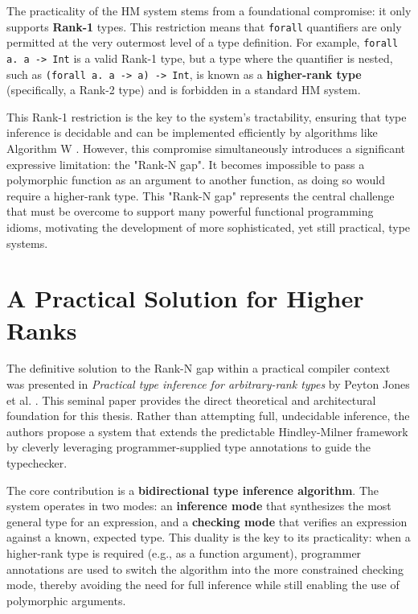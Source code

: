 The practicality of the HM system stems from a foundational compromise: it only supports \textbf{Rank-1} types. This restriction means that \texttt{forall} quantifiers are only permitted at the very outermost level of a type definition. For example, \texttt{forall a. a -> Int} is a valid Rank-1 type, but a type where the quantifier is nested, such as \texttt{(forall a. a -> a) -> Int}, is known as a \textbf{higher-rank type} (specifically, a Rank-2 type) and is forbidden in a standard HM system.

This Rank-1 restriction is the key to the system's tractability, ensuring that type inference is decidable and can be implemented efficiently by algorithms like Algorithm W \cite{jones-practical-2007}. However, this compromise simultaneously introduces a significant expressive limitation: the "Rank-N gap". It becomes impossible to pass a polymorphic function as an argument to another function, as doing so would require a higher-rank type. This "Rank-N gap" represents the central challenge that must be overcome to support many powerful functional programming idioms, motivating the development of more sophisticated, yet still practical, type systems.

\section{A Practical Solution for Higher Ranks}
\label{sec:LitReviewJones2007}

The definitive solution to the Rank-N gap within a practical compiler context was presented in \textit{Practical type inference for arbitrary-rank types} by Peyton Jones et al. \cite{jones-practical-2007}. This seminal paper provides the direct theoretical and architectural foundation for this thesis. Rather than attempting full, undecidable inference, the authors propose a system that extends the predictable Hindley-Milner framework by cleverly leveraging programmer-supplied type annotations to guide the typechecker.

The core contribution is a \textbf{bidirectional type inference algorithm}. The system operates in two modes: an \textbf{inference mode} that synthesizes the most general type for an expression, and a \textbf{checking mode} that verifies an expression against a known, expected type. This duality is the key to its practicality: when a higher-rank type is required (e.g., as a function argument), programmer annotations are used to switch the algorithm into the more constrained checking mode, thereby avoiding the need for full inference while still enabling the use of polymorphic arguments.

